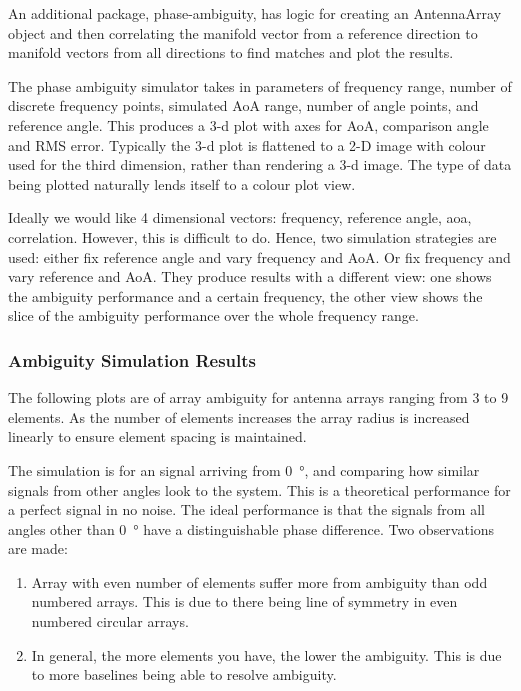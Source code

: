 An additional package, phase-ambiguity, has logic for creating an AntennaArray object and then correlating the manifold vector from a reference direction to manifold vectors from all directions to find matches and plot the results.

The phase ambiguity simulator takes in parameters of frequency range, number of discrete frequency points, simulated AoA range, number of angle points, and reference angle.
This produces a 3-d plot with axes for AoA, comparison angle and RMS error. Typically the 3-d plot is flattened to a 2-D image with colour used for the third dimension, rather than rendering a 3-d image. The type of data being plotted naturally lends itself to a colour plot view.


Ideally we would like 4 dimensional vectors: frequency, reference angle, aoa, correlation. However, this is difficult to do. Hence, two simulation strategies are used: either fix reference angle and vary frequency and AoA. Or fix frequency and vary reference and AoA. They produce results with a different view: one shows the ambiguity performance and a certain frequency, the other view shows the slice of the ambiguity performance over the whole frequency range.

\subsubsection{Ambiguity Simulation Results}
The following plots are of array ambiguity for antenna arrays ranging from 3 to 9 elements. As the number of elements increases the array radius is increased linearly to ensure element spacing is maintained.

The simulation is for an signal arriving from \SI{0}{\degree}, and comparing how similar signals from other angles look to the system. This is a theoretical performance for a perfect signal in no noise. The ideal performance is that the signals from all angles other than \SI{0}{\degree} have a distinguishable phase difference. Two observations are made:
\begin{enumerate}
  \item Array with even number of elements suffer more from ambiguity than odd numbered arrays. This is due to there being line of symmetry in even numbered circular arrays.
  \item In general, the more elements you have, the lower the ambiguity. This is due to more baselines being able to resolve ambiguity.
\end{enumerate}

